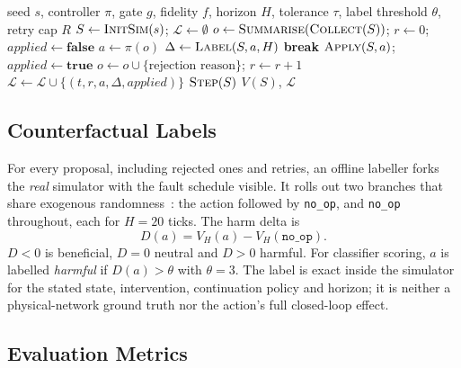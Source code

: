 \documentclass[conference]{IEEEtran}
\begin{document}
\begin{algorithm}[t]
\caption{Gated episode with paired counterfactual labelling}
\label{alg:episode}
\begin{algorithmic}[1]
\Require seed $s$, controller $\pi$, gate $g$, fidelity $f$, horizon $H$, tolerance $\tau$, label threshold $\theta$, retry cap $R$
\State $S \gets \textsc{InitSim}(s)$; \; $\mathcal{L} \gets \emptyset$
    \State $o \gets \textsc{Summarise}(\textsc{Collect}(S))$; \; $r \gets 0$; \; $\mathit{applied} \gets \textbf{false}$
      \State $a \gets \pi(o)$
      \State $\Delta \gets \textsc{Label}(S, a, H)$ 
       \textbf{break} \EndIf
       \State $\textsc{Apply}(S, a)$; \; $\mathit{applied} \gets \textbf{true}$
      \Else \State $o \gets o \cup \{\text{rejection reason}\}$; \; $r \gets r + 1$ \EndIf
      \State $\mathcal{L} \gets \mathcal{L} \cup \{(t, r, a, \Delta, \mathit{applied})\}$
    \EndWhile
  \EndIf
  \State $\textsc{Step}(S)$
\EndFor
\State \Return $V(S)$, $\mathcal{L}$ 
\end{algorithmic}
\end{algorithm}

\subsection{Counterfactual Labels}

For every proposal, including rejected ones and retries, an offline labeller forks the \emph{real} simulator with the fault schedule visible. It rolls out two branches that share exogenous randomness~\cite{stochsim}: the action followed by \texttt{no\_op}, and \texttt{no\_op} throughout, each for $H=20$ ticks. The harm delta is
\begin{equation}
D(a) = V_H(a) - V_H(\texttt{no\_op}).
\label{eq:delta}
\end{equation}
$D<0$ is beneficial, $D=0$ neutral and $D>0$ harmful. For classifier scoring, $a$ is labelled \emph{harmful} if $D(a)>\theta$ with $\theta=3$. The label is exact inside the simulator for the stated state, intervention, continuation policy and horizon; it is neither a physical-network ground truth nor the action's full closed-loop effect.

\subsection{Evaluation Metrics}
\end{document}
